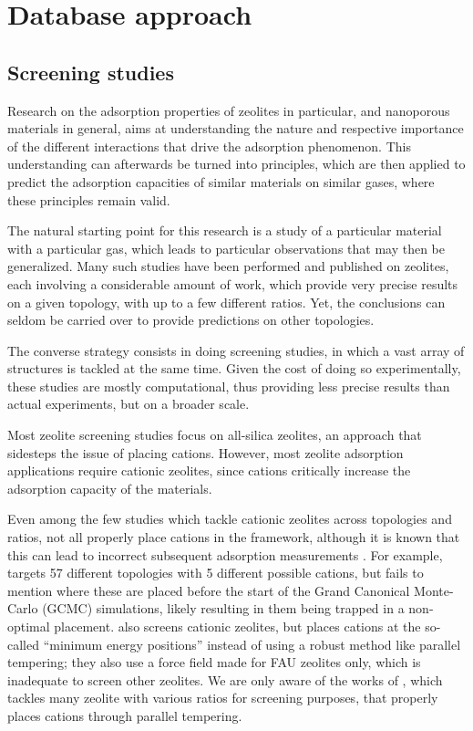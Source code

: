 \documentclass[main.tex]{subfiles}
\begin{document}
\chapter{Database approach}\clearpage

\section{Screening studies}

Research on the adsorption properties of zeolites in particular, and nanoporous materials in general, aims at understanding the nature and respective importance of the different interactions that drive the adsorption phenomenon. This understanding can afterwards be turned into principles, which are then applied to predict the adsorption capacities of similar materials on similar gases, where these principles remain valid.

The natural starting point for this research is a study of a particular material with a particular gas, which leads to particular observations that may then be generalized. Many such studies have been performed and published on zeolites, each involving a considerable amount of work, which provide very precise results on a given topology, with up to a few different \SiAl ratios. Yet, the conclusions can seldom be carried over to provide predictions on other topologies.

The converse strategy consists in doing screening studies, in which a vast array of structures is tackled at the same time. Given the cost of doing so experimentally, these studies are mostly computational, thus providing less precise results than actual experiments, but on a broader scale.

Most zeolite screening studies focus on all-silica zeolites, an approach that sidesteps the issue of placing cations. However, most zeolite adsorption applications require cationic zeolites, since cations critically increase the adsorption capacity of the materials.

Even among the few studies which tackle cationic zeolites across topologies and \SiAl ratios, not all properly place cations in the framework, although it is known that this can lead to incorrect subsequent adsorption measurements \autocite{Fang2016}. For example, \cite{Mousavi2023} targets 57 different topologies with 5 different possible cations, but fails to mention where these are placed before the start of the Grand Canonical Monte-Carlo (GCMC) simulations, likely resulting in them being trapped in a non-optimal placement. \Cite{SmitNature2012} also screens cationic zeolites, but places cations at the so-called ``minimum energy positions'' instead of using a robust method like parallel tempering; they also use a force field made for FAU zeolites only, which is inadequate to screen other zeolites.
We are only aware of the works of \cite{Fang2016}, which tackles many zeolite with various \SiAl ratios for screening purposes, that properly places cations through parallel tempering.
\end{document}
